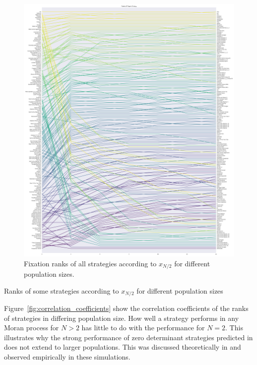 \documentclass{article}
\begin{document}
\begin{figure}[!hbtp]
    \centering
    \includegraphics[height=.9\textheight]{./img/average_rank_vs_population_size_coexist.pdf}
    \caption{Fixation ranks of all strategies according to \(x_{N/2}\) for different
    population sizes.}
    \label{fig:ranks_v_size_coexist}
\end{figure}

\begin{table}[!hbtp]
    \centering
    \scriptsize
    
    \caption{Ranks of some strategies according to \(x_{N/2}\) for different
    population sizes}
    \label{tbl:ranks_v_size_coexist}
\end{table}


Figure~\ref{fig:correlation_coefficients} show the correlation coefficients
of the ranks of strategies in differing population size. How well a strategy
performs in any Moran process for \(N>2\) has
little to do with the performance for \(N=2\). This illustrates why the strong
performance of zero determinant strategies predicted in \cite{Press2012} does
not extend to larger populations. This was discussed theoretically in
\cite{Adami2013} and observed empirically in these simulations.
\end{document}
